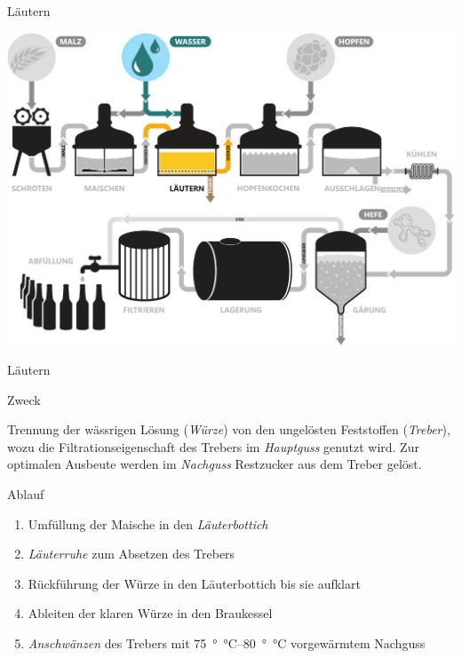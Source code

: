 \documentclass[9pt, ngerman]{beamer}
\begin{document}
\begin{frame}{Läutern}
  \begin{center}
    \vspace{0.5cm}
    \includegraphics[width=\textwidth]{pdfs/prozess-laeutern.pdf}
  \end{center}
\end{frame}
\begin{frame}{Läutern}
  \begin{block}{Zweck}
    \vspace{0.5em}

    Trennung der wässrigen Lösung (\emph{Würze}) von den ungelösten Feststoffen
    (\emph{Treber}), wozu die Filtrationseigenschaft des Trebers im
    \emph{Hauptguss} genutzt wird. Zur optimalen Ausbeute werden im
    \emph{Nachguss} Restzucker aus dem Treber gelöst.

  \end{block}

  \begin{block}{Ablauf}
    \begin{enumerate}
      \item Umfüllung der Maische in den \emph{Läuterbottich}
      \item \emph{Läuterruhe} zum Absetzen des Trebers
      \item Rückführung der Würze in den Läuterbottich bis sie aufklart
      \item Ableiten der klaren Würze in den Braukessel
      \item \emph{Anschwänzen} des Trebers mit \SIrange{75}{80}{\degree\celsius}
        vorgewärmtem Nachguss
    \end{enumerate}
  \end{block}
\end{frame}
\end{document}
